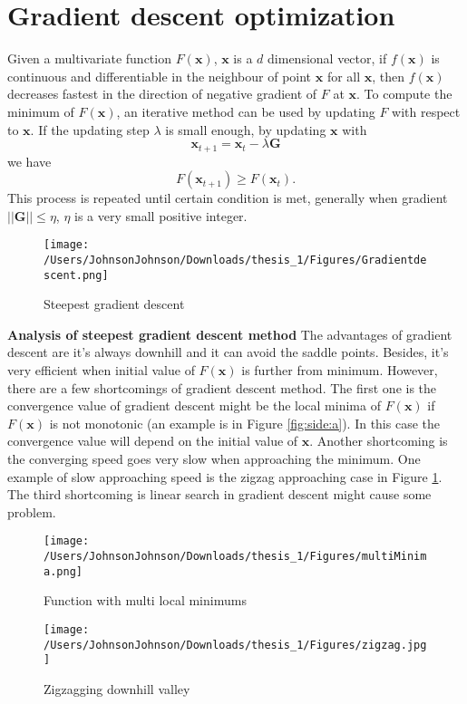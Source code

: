  \section{Gradient descent optimization}
 Given a multivariate function $F(\bm{x})$, $\bm{x}$ is a $d$ dimensional vector, if $f(\bm{x})$ is continuous and differentiable in the neighbour of point $\bm{x}$ for all $\bm{x}$, then $f(\bm{x})$ decreases fastest in the direction of negative gradient of $F$ at $\bm{x}$. To compute the minimum of $F(\bm{x})$, an iterative method can be used by updating $F$ with respect to $\bm{x}$. If the updating step $\lambda$ is small enough, by updating $\bm{x}$ with 
 \begin{equation}
 \bm{x}_{t+1} = \bm{x}_{t} - \lambda \bm{G}
 \end{equation}
we have 
  \begin{equation}
 F(\bm{x}_{t+1}) \ge F(\bm{x}_t).
  \end{equation}
This process is repeated until certain condition is met, generally when gradient $||\bm{G}|| \le \eta$, $\eta$ is a very small positive integer. 
\begin{figure}
\centering
\texttt{[image: /Users/JohnsonJohnson/Downloads/thesis\_1/Figures/Gradientdescent.png]}
\caption{Steepest gradient descent}
\vspace{0em}
\end{figure} 

\textbf{Analysis of steepest gradient descent method} The advantages of gradient descent are it's always downhill and it can avoid the saddle points. Besides, it's very efficient when initial value of $F(\bm{x})$ is further from minimum. However, there are a few shortcomings of gradient descent method. The first one is the convergence value of gradient descent might be the local minima of $F(\bm{x})$ if $F(\bm{x})$ is not monotonic (an example is in Figure \ref{fig:side:a}). In this case the convergence value will depend on the initial value of $\bm{x}$. Another shortcoming is the converging speed goes very slow when approaching the minimum. One example of slow approaching speed is the zigzag approaching case in Figure \ref{fig:side:b}. The third shortcoming is linear search in gradient descent might cause some problem.
\begin{figure}[H]
\begin{minipage}[t]{0.5\linewidth}
\centering
\texttt{[image: /Users/JohnsonJohnson/Downloads/thesis\_1/Figures/multiMinima.png]}
\caption{Function with multi local minimums}
\label{fig:side:a}
\end{minipage}%
\begin{minipage}[t]{0.5\linewidth}
\centering
\texttt{[image: /Users/JohnsonJohnson/Downloads/thesis\_1/Figures/zigzag.jpg]}
\caption{Zigzagging downhill valley}
\label{fig:side:b}
\end{minipage}
\end{figure}

